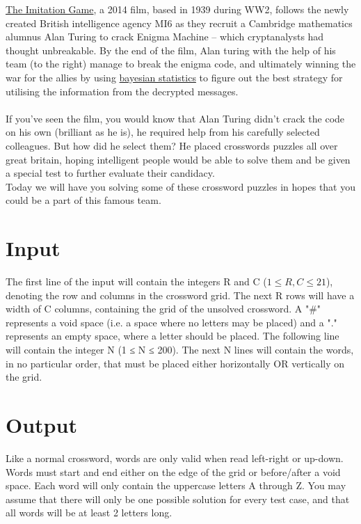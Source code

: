 

\noindent \href{https://www.imdb.com/title/tt2084970/}{The Imitation Game}, a 2014 film, based in 1939 during WW2, follows the newly created British intelligence agency MI6 as they recruit a Cambridge mathematics alumnus Alan Turing to crack Enigma Machine -- which cryptanalysts had thought unbreakable. By the end of the film, Alan turing with the help of his team (to the right) manage to break the enigma code, and ultimately winning the war for the allies by using \href{https://rss.onlinelibrary.wiley.com/doi/pdf/10.1111/j.1740-9713.2010.00424.x}{bayesian statistics} to figure out the best strategy for utilising the information from the decrypted messages. \\
\\

\noindent If you've seen the film, you would know that Alan Turing didn't crack the code on his own (brilliant as he is), he required help from his carefully selected colleagues. But how did he select them? He placed crosswords puzzles all over great britain, hoping intelligent people would be able to solve them and be given a special test to further evaluate their candidacy.  \\


\noindent Today we will have you solving some of these crossword puzzles in hopes that you could be a part of this famous team. \\

\section*{Input}

The first line of the input will contain the integers R and C ($1 \leq R,C \leq 21$), denoting the row and columns in the crossword grid. The next R rows will have a width of C columns, containing the grid of the unsolved crossword. A "#" represents a void space (i.e. a space where no letters may be placed) and a "." represents an empty space, where a letter should be placed. The following line will contain the integer N (1 ≤ N ≤ 200). The next N lines will contain the words, in no particular order, that must be placed either horizontally OR vertically on the grid.


\section*{Output}
Like a normal crossword, words are only valid when read left-right or up-down. Words must start and end either on the edge of the grid or before/after a void space. Each word will only contain the uppercase letters A through Z. You may assume that there will only be one possible solution for every test case, and that all words will be at least 2 letters long.
